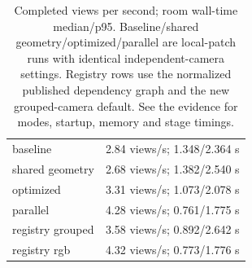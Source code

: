 \begin{table}[ht]
\centering\small
\begin{tabular}{p{.53\linewidth}p{.36\linewidth}}
\toprule
baseline & 2.84 views/s; 1.348/2.364 s \\
shared geometry & 2.68 views/s; 1.382/2.540 s \\
optimized & 3.31 views/s; 1.073/2.078 s \\
parallel & 4.28 views/s; 0.761/1.775 s \\
registry grouped & 3.58 views/s; 0.892/2.642 s \\
registry rgb & 4.32 views/s; 0.773/1.776 s \\
\bottomrule
\end{tabular}
\caption{Completed views per second; room wall-time median/p95. Baseline/shared geometry/optimized/parallel are local-patch runs with identical independent-camera settings. Registry rows use the normalized published dependency graph and the new grouped-camera default. See the evidence for modes, startup, memory and stage timings.}\label{tab:performance}
\end{table}
